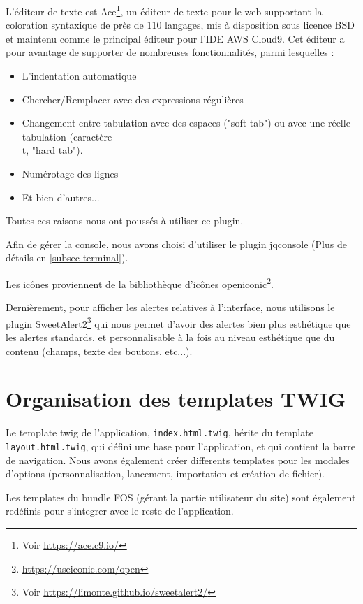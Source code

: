 L'éditeur de texte est Ace\footnote{Voir \url{https://ace.c9.io/}}, un éditeur de texte pour le web supportant la coloration syntaxique de près de 110 langages, mis à disposition sous licence BSD et maintenu comme le principal éditeur pour l'IDE AWS Cloud9. Cet éditeur a pour avantage de supporter de nombreuses fonctionnalités, parmi lesquelles :

\begin{itemize}
  \item L'indentation automatique
  \item Chercher/Remplacer avec des expressions régulières
  \item Changement entre tabulation avec des espaces ("soft tab") ou avec une réelle tabulation (caractère \\t, "hard tab").
  \item Numérotage des lignes
  \item Et bien d'autres...
\end{itemize}

Toutes ces raisons nous ont poussés à utiliser ce plugin.

Afin de gérer la console, nous avons choisi d'utiliser le plugin jqconsole (Plus de détails en \ref{subsec-terminal}).

Les icônes proviennent de la bibliothèque d'icônes openiconic\footnote{\url{https://useiconic.com/open}}.

Dernièrement, pour afficher les alertes relatives à l'interface, nous utilisons le plugin SweetAlert2\footnote{Voir \url{https://limonte.github.io/sweetalert2/}} qui nous permet d'avoir des alertes bien plus esthétique que les alertes standards, et personnalisable à la fois au niveau esthétique que du contenu (champs, texte des boutons, etc...).

\section{Organisation des templates TWIG}

Le template twig de l'application, \texttt{index.html.twig}, hérite du template \texttt{layout.html.twig}, qui défini une base pour l'application, et qui contient la barre de navigation. Nous avons également créer differents templates pour les modales d'options (personnalisation, lancement, importation et création de fichier).

Les templates du bundle FOS (gérant la partie utilisateur du site) sont également redéfinis pour s'integrer avec le reste de l'application.

